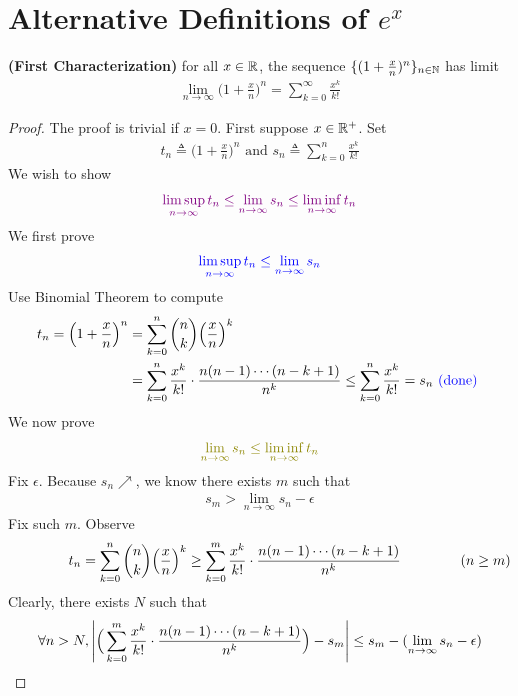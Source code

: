 \documentclass{report}
\begin{document}
\section{Alternative Definitions of $e^x$}
\begin{theorem}
\textbf{(First Characterization)} for all $x\in\mathbb{R}$, the sequence $\{ (1+\frac{x}{n})^n \}_{n\in\mathbb{N}}$ has limit 
\begin{align*}
\lim_{n\to \infty} \Big(1+\frac{x}{n}\Big)^n = \sum_{k=0}^\infty \frac{x^k}{k!}
\end{align*}
\end{theorem}
\begin{proof}
The proof is trivial if $x=0$. First suppose  $x\in\mathbb{R}^+$. Set 
\begin{align*}
t_n\triangleq \Big(1+\frac{x}{n}\Big)^n\text{ and }s_n\triangleq \sum_{k=0}^n \frac{x^k}{k!}
\end{align*}
We wish to show 
\begin{align*}
\textcolor{violet}{\limsup_{n\to\infty} t_n\leq \lim_{n\to \infty}s_n\leq \liminf_{n\to\infty} t_n}
\end{align*}
We first prove 
\begin{align*}
\textcolor{blue}{\limsup_{n\to\infty} t_n\leq \lim_{n\to \infty}s_n}
\end{align*}
Use Binomial Theorem to compute 
\begin{align*}
t_n=\Big(1+\frac{x}{n} \Big)^n&= \sum_{k=0}^n \binom{n}{k} \Big(\frac{x}{n} \Big)^k\\
&=\sum_{k=0}^n \frac{x^k}{k!} \cdot \frac{n(n-1)\cdots (n-k+1)}{n^k} \leq \sum_{k=0}^n \frac{x^k}{k!}=s_n \textcolor{blue}{\text{ (done) }}
\end{align*}
We now prove 
\begin{align*}
\olive{\lim_{n\to \infty}s_n\leq \liminf_{n\to\infty} t_n}
\end{align*}
Fix $\epsilon $. Because $s_n\nearrow $, we know there exists  $m$ such that 
 \begin{align*}
s_m> \lim_{n\to \infty}s_n -\epsilon 
\end{align*}
Fix such $m$. Observe 
 \begin{align*}
\hspace{1.5cm}t_n=\sum _{k=0}^n \binom{n}{k}\Big(\frac{x}{n} \Big)^k\geq \sum_{k=0}^m \frac{x^k}{k!}\cdot \frac{n(n-1)\cdots (n-k+1)}{n^k}\hspace{1.5cm}(n\geq m)
\end{align*}
Clearly, there exists $N$ such that 
\begin{align*}
  \forall n>N, \abso{\Big( \sum_{k=0}^m \frac{x^k}{k!}\cdot \frac{n(n-1)\cdots (n-k+1)}{n^k}\Big) - s_m }\leq  s_m-(\lim_{n\to \infty}s_n-\epsilon )

\end{align*}
\end{proof}
\end{document}
